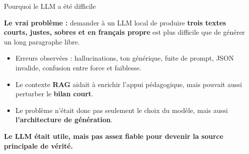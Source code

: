 ﻿\documentclass[10pt,aspectratio=169]{beamer}
\begin{document}
\begin{frame}{Pourquoi le LLM a été difficile}
\begin{keybox}[colframe=danger!35,colback=danger!4]
\textbf{Le vrai problème :} demander à un LLM local de produire \textbf{trois textes courts, justes, sobres et en français propre} est plus difficile que de générer un long paragraphe libre.
\end{keybox}
\vspace{0.35cm}
\begin{itemize}
    \item Erreurs observées : hallucinations, ton générique, fuite de prompt, JSON invalide, confusion entre force et faiblesse.
    \item Le contexte \textbf{RAG} aidait à enrichir l'appui pédagogique, mais pouvait aussi perturber le \textbf{bilan court}.
    \item Le problème n'était donc pas seulement le choix du modèle, mais aussi \textbf{l'architecture de génération}. 
\end{itemize}
\vspace{0.3cm}
\begin{tcolorbox}[colback=secondary!45,colframe=primary!25]
\small \textbf{Le LLM était utile, mais pas assez fiable pour devenir la source principale de vérité.}
\end{tcolorbox}
\end{frame}
\end{document}
